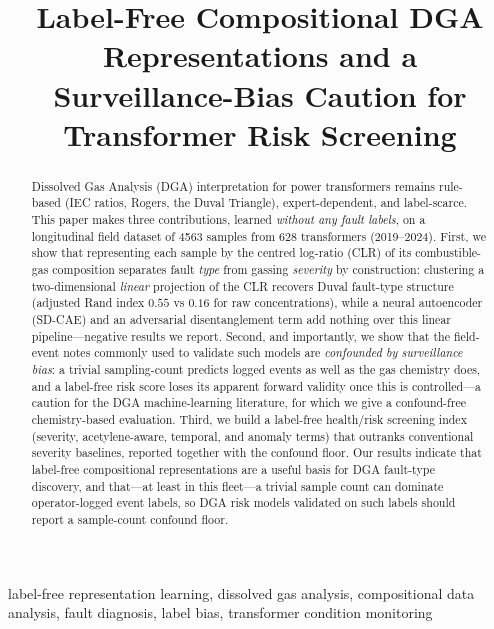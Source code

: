 \documentclass[conference]{IEEEtran}
\begin{document}
\title{Label-Free Compositional DGA Representations and a
Surveillance-Bias Caution for Transformer Risk Screening}

\author{
\and
{}
}

\maketitle

\begin{abstract}
Dissolved Gas Analysis (DGA) interpretation for power transformers remains
rule-based (IEC ratios, Rogers, the Duval Triangle), expert-dependent, and
label-scarce. This paper makes three contributions, learned \emph{without any fault
labels}, on a longitudinal field dataset of 4563 samples from 628 transformers
(2019--2024). First, we show that representing each sample by the centred log-ratio (CLR) of its
combustible-gas composition separates fault \emph{type} from gassing \emph{severity}
by construction: clustering a two-dimensional \emph{linear} projection of the CLR
recovers Duval fault-type structure (adjusted Rand index $0.55$ vs $0.16$ for raw
concentrations), while a neural autoencoder (SD-CAE) and an adversarial
disentanglement term add nothing over this linear pipeline---negative results we
report. Second, and importantly, we show that the field-event notes commonly used to
validate such models are \emph{confounded by surveillance bias}: a trivial
sampling-count predicts logged events as well as the gas chemistry does, and a
label-free risk score loses its apparent forward validity once this is controlled---a caution
for the DGA machine-learning literature, for which we give a confound-free
chemistry-based evaluation. Third, we build a label-free health/risk screening index
(severity, acetylene-aware, temporal, and anomaly terms) that outranks conventional
severity baselines, reported together with the confound floor. Our results indicate that
label-free compositional representations are a useful basis for DGA fault-type discovery, and
that---at least in this fleet---a trivial sample count can dominate operator-logged event labels,
so DGA risk models validated on such labels should report a sample-count confound floor.
\end{abstract}

\begin{IEEEkeywords}
label-free representation learning, dissolved gas analysis, compositional data analysis,
fault diagnosis, label bias, transformer condition monitoring
\end{IEEEkeywords}











\end{document}
